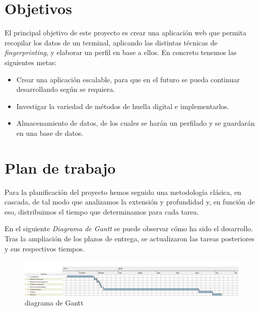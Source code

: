 \section{Objetivos}
 
El principal objetivo de este proyecto es crear una aplicación web que permita recopilar los datos de un terminal, aplicando las distintas técnicas de \textit{fingerprinting}, y elaborar un perfil en base a ellos. En concreto tenemos las siguientes metas:
\begin{itemize}
    \item Crear una aplicación escalable, para que en el futuro se pueda continuar desarrollando según se requiera.
    \item Investigar la variedad de métodos de huella digital e implementarlos.
    \item Almacenamiento de datos, de los cuales se harán un perfilado y se guardarán en una base de datos.
\end{itemize}

\section{Plan de trabajo}
Para la planificación del proyecto hemos seguido una metodología clásica, en cascada, de tal modo que analizamos la extensión y profundidad y, en función de eso, distribuimos el tiempo que determinamos para cada tarea.\par
\vspace{3mm}
En el siguiente \textit{Diagrama de Gantt} se puede observar cómo ha sido el desarrollo. Tras la ampliación de los plazos de entrega, se actualizaron las tareas posteriores y sus respectivos tiempos.\par
\vspace{3mm}
\begin{figure}[H]
    \centering
    \includegraphics[width=1\textwidth]{Images/diagramaGantt.png}
    \caption{diagrama de Gantt}
    \label{fig:diagramaGantt}
\end{figure}